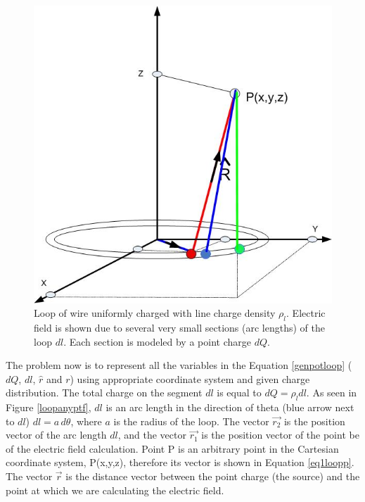 \documentclass{ximera}
\begin{document}
\begin{figure}[!ht]
\begin{center}
\includegraphics[scale=0.4]{../jpg/ringefieldanywheremorechargespot.jpg}
\end{center}
\caption{Loop of wire uniformly charged with line charge density $\rho_l$. Electric field is shown due to several very small sections (arc lengths) of the loop $dl$.
Each section is modeled by a point charge $dQ$.}
\label{loopanypt1}
\end{figure}



The problem now  is to represent all the variables in the Equation \ref{genpotloop}  ( $dQ$, $dl$, $\hat{r}$ and $r$) using  appropriate coordinate system and given charge distribution.
The  total charge on the segment $dl$ is equal to $dQ=\rho_l dl$. As seen in Figure \ref{loopanyptf}, $dl$ is an arc length in the direction of theta (blue arrow next to $dl$) $dl=a\, d\theta$, where $ a$ is the radius of the loop. The vector $\vec{r_2}$ is the position vector of the arc length $dl$, and the vector $\vec{r_1}$  is the position vector of the point be of the electric field calculation. Point P is an arbitrary point in the Cartesian coordinate system, P(x,y,z), therefore its vector is shown in Equation \ref{eq1loopp}.  The vector $\vec{r}$ is the distance vector between the point charge (the source) and the point at which we are calculating the electric field. 
\end{document}
